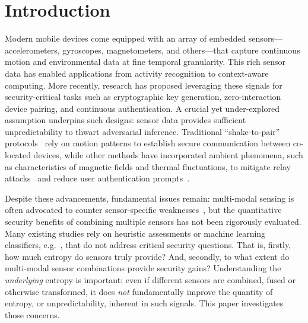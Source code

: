 \section{Introduction}
\label{sec:intro}

Modern mobile devices come equipped with an array of embedded sensors---accelerometers, gyroscopes, magnetometers, and others---that capture continuous motion and environmental data at fine temporal granularity. This rich sensor data has enabled applications from activity recognition to context-aware computing. More recently, research has proposed leveraging these signals for security-critical tasks such as cryptographic key generation, zero-interaction device pairing, and continuous authentication. A crucial yet under-explored assumption underpins such designs: sensor data provides sufficient unpredictability to thwart adversarial inference. Traditional ``shake-to-pair'' protocols~\cite{mayrhofer2009shake} rely on motion patterns to establish secure communication between co-located devices, while other methods have incorporated ambient phenomena, such as characteristics of magnetic fields and thermal fluctuations, to mitigate relay attacks~\cite{shrestha2014drone,shrestha2018sensor,markantonakis2024using,gurulian2017effectiveness,shepherd2017applicability} and reduce user authentication prompts~\cite{krhovjak2007sources,riva2012progressive,shi2011senguard,miettinen2014conxsense,li2013unobservable}. 

Despite these advancements, fundamental issues remain: multi-modal sensing is often advocated to counter sensor-specific weaknesses~\cite{shrestha2014drone,markantonakis2024using,truong2014comparing,mehrnezhad2015tap}, but the quantitative security benefits of combining multiple sensors has not been rigorously evaluated. Many existing studies rely on heuristic assessments or machine learning classifiers, e.g.~\cite{markantonakis2024using,mehrnezhad2015tap,gurulian2018good,shrestha2014drone,truong2014comparing}, that do not address critical security questions. That is, firstly, how much entropy do sensors truly provide? And, secondly, to what extent do multi-modal sensor combinations provide security gains? Understanding the \emph{underlying} entropy is important: even if different sensors are combined, fused or otherwise transformed, it does \emph{not} fundamentally improve the quantity of entropy, or unpredictability, inherent in such signals. This paper investigates those concerns.

